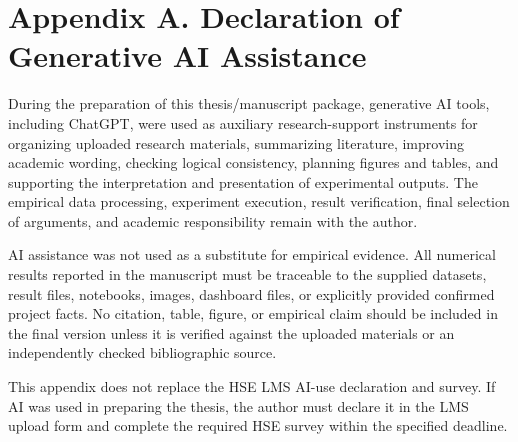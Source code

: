 \section*{Appendix A. Declaration of Generative AI Assistance}
During the preparation of this thesis/manuscript package, generative AI tools, including ChatGPT, were used as auxiliary research-support instruments for organizing uploaded research materials, summarizing literature, improving academic wording, checking logical consistency, planning figures and tables, and supporting the interpretation and presentation of experimental outputs. The empirical data processing, experiment execution, result verification, final selection of arguments, and academic responsibility remain with the author.

AI assistance was not used as a substitute for empirical evidence. All numerical results reported in the manuscript must be traceable to the supplied datasets, result files, notebooks, images, dashboard files, or explicitly provided confirmed project facts. No citation, table, figure, or empirical claim should be included in the final version unless it is verified against the uploaded materials or an independently checked bibliographic source.

This appendix does not replace the HSE LMS AI-use declaration and survey. If AI was used in preparing the thesis, the author must declare it in the LMS upload form and complete the required HSE survey within the specified deadline.
